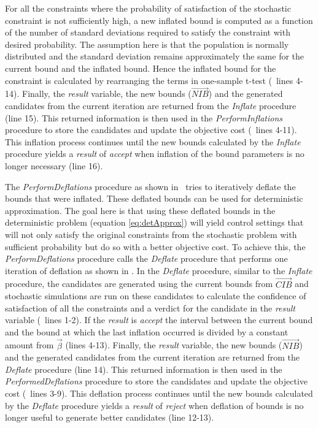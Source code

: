 \documentclass[a4paper, 12pt]{article} %
\begin{document}
For all the constraints where the probability of satisfaction of the stochastic constraint is not sufficiently high, a new inflated bound is computed as a function of the number of standard deviations required to satisfy the constraint with desired probability. The assumption here is that the population is normally distributed and the standard deviation remains approximately the same for the current bound and the inflated bound. Hence the inflated bound for the constraint is calculated by rearranging the terms in one-sample t-test (\algoInflate~lines 4-14). 
Finally, the \textit{result} variable, the new bounds ($\overrightarrow{NIB}$) and the generated candidates from the current iteration are returned from the \textit{Inflate} procedure (line 15). 
This returned information is then used in the \textit{PerformInflations} procedure to store the candidates and update the objective cost (\algoPerfInfl~lines 4-11). This inflation process continues until the new bounds calculated by the \textit{Inflate} procedure yields a \textit{result} of \textit{accept} when inflation of the bound parameters is no longer necessary (line 16).

The \textit{PerformDeflations} procedure as shown in \algoPerfDefl~tries to iteratively deflate the bounds that were inflated. These deflated bounds can be used for deterministic approximation. The goal here is that using these deflated bounds in the deterministic problem (equation \ref{eq:detApprox}) will yield control settings that will not only satisfy the original constraints from the stochastic problem with sufficient probability but do so with a better objective cost.  
To achieve this, the \textit{PerformDeflations} procedure calls the \textit{Deflate} procedure that performs one iteration of deflation as shown in \algoDeflate. 
In the \textit{Deflate} procedure, similar to the \textit{Inflate} procedure, the candidates are generated using the current bounds from $\overrightarrow{CIB}$ and stochastic simulations are run on these candidates to calculate the confidence of satisfaction of all the constraints and a verdict for the candidate in the \textit{result} variable (\algoDeflate~lines 1-2). 
If the \textit{result} is \textit{accept} the interval between the current bound and the bound at which the last inflation occurred is divided by a constant amount from $\vec{\beta}$ (lines 4-13). 
Finally, the \textit{result} variable, the new bounds ($\overrightarrow{NIB}$) and the generated candidates from the current iteration are returned from the \textit{Deflate} procedure (line 14). 
This returned information is then used in the \textit{PerformedDeflations} procedure to store the candidates and update the objective cost (\algoPerfDefl~lines 3-9). This deflation process continues until the new bounds calculated by the \textit{Deflate} procedure yields a \textit{result} of \textit{reject} when deflation of bounds is no longer useful to  generate better candidates (line 12-13).
\end{document}
